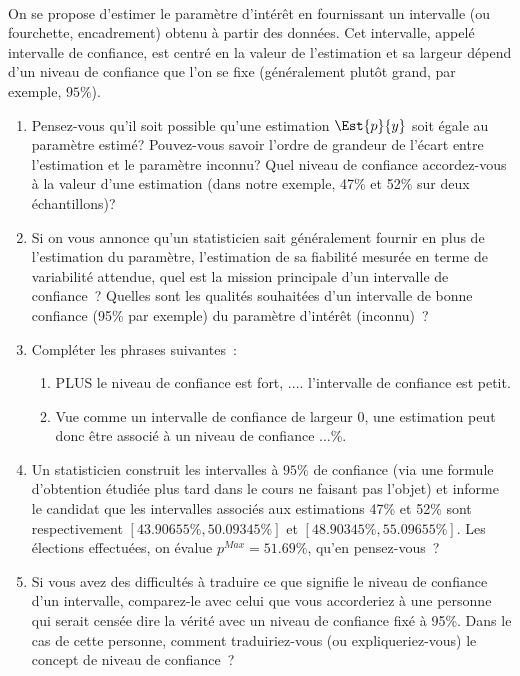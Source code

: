 \documentclass[10pt]{report}
\begin{document}
\begin{exercice} ${}$

On se propose d'estimer le paramètre d'intérêt en fournissant un intervalle (ou fourchette, encadrement) obtenu à partir des données. Cet intervalle, appelé intervalle de confiance, est centré en la valeur de l'estimation et sa largeur dépend d'un niveau de confiance que l'on se fixe (généralement plutôt grand, par exemple, $95\%$). 
\begin{enumerate}

\item Pensez-vous qu'il soit possible qu'une estimation $\Est{p}{y}$ soit égale au paramètre estimé? Pouvez-vous savoir l'ordre de grandeur de l'écart entre l'estimation et le paramètre inconnu?
Quel niveau de confiance accordez-vous à la valeur d'une estimation (dans notre exemple, 47\% et 52\% sur deux échantillons)?

\item Si on vous annonce qu'un statisticien sait généralement fournir en plus de l'estimation du paramètre, l'estimation de sa fiabilité mesurée en terme de variabilité attendue, quel est la mission principale d'un intervalle de confiance~? Quelles sont les qualités souhaitées d'un intervalle de bonne confiance (95\% par exemple) du paramètre d'intérêt (inconnu)~? 

\item Compléter les phrases suivantes~:
\begin{enumerate}
\item PLUS le niveau de confiance est fort, .... l'intervalle de confiance est petit.
\item Vue comme un intervalle de confiance de largeur 0, une estimation peut donc être associé à un niveau de confiance ...\%.
\end{enumerate} 

\item Un statisticien construit les intervalles à $95\%$ de confiance (via une formule d'obtention étudiée plus tard dans le cours ne faisant pas l'objet) et informe le candidat que les intervalles associés aux estimations 47\% et 52\% sont respectivement $[43.90655\%,50.09345\%]$ et $[48.90345\%,55.09655\%]$. Les élections effectuées, on évalue $p^{Max}=51.69\%$, qu'en pensez-vous~?

\item Si vous avez des difficultés à traduire ce que signifie le niveau de confiance d'un intervalle, comparez-le avec celui que vous accorderiez à une personne qui serait censée dire la vérité avec un niveau de confiance fixé à 95\%. Dans le cas de cette personne, comment traduiriez-vous (ou expliqueriez-vous) le concept de niveau de confiance~? \\


\end{enumerate}
\end{exercice}
\end{document}
